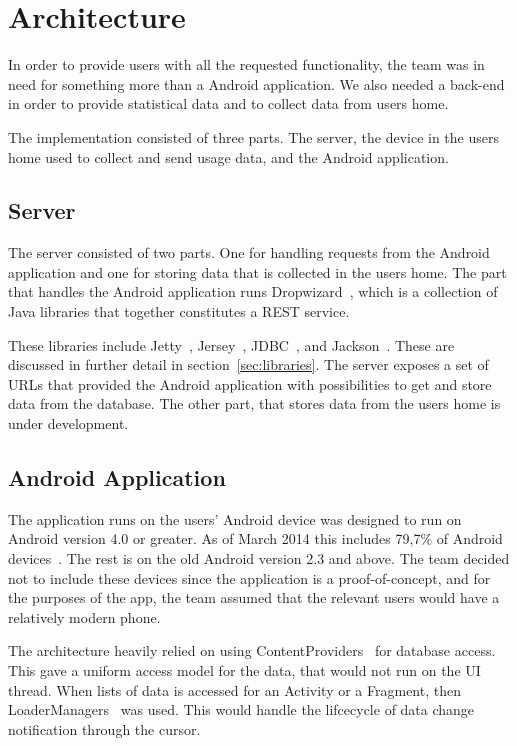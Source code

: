 \section{Architecture}

In order to provide users with all the requested functionality, the team was in need for something more than a Android application. We also needed a back-end in order to provide statistical data and to collect data from users home.

The implementation consisted of three parts. The server, the device in the users home used to collect and send usage data, and the Android application.

\subsection{Server}
The server consisted of two parts. One for handling requests from the Android application and one for storing data that is collected in the users home. 
The part that handles the Android application runs Dropwizard~\cite{dropwizard}, which is a collection of Java libraries that together constitutes a REST service. 

These libraries include Jetty~\cite{jetty}, Jersey~\cite{jersey}, JDBC~\cite{jdbc}, and Jackson~\cite{jackson}. These are discussed in further detail in section~\ref{sec:libraries}.
The server exposes a set of URLs that provided the Android application with 
possibilities to get and store data from the database. The other part, that stores data from the users home is under development.

\subsection{Android Application}
The application runs on the users' Android device was designed to run on Android version 4.0 or greater. As of March 2014 this includes 79,7\% of Android devices~\cite{AndroidDeviceFragmentation}. The rest is on the old Android version 2.3 and above. The team decided not to include these devices since the application is a proof-of-concept, and for the purposes of the app, the team assumed that the relevant users would have a relatively modern phone. 

The architecture heavily relied on using ContentProviders~\cite{contentproviders} for database access. This gave a uniform access model for the data, that would not run on the UI thread. When lists of data is accessed for an Activity or a Fragment, then LoaderManagers~\cite{loadermanager} was used. This would handle the lifcecycle of data change notification through the cursor. 

